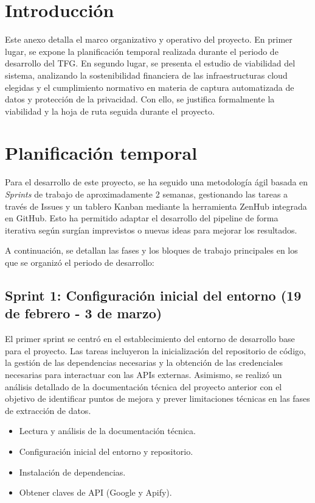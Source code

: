 
\section{Introducción}
Este anexo detalla el marco organizativo y operativo del proyecto. En primer lugar, se expone la planificación temporal realizada durante el periodo de desarrollo del TFG. En segundo lugar, se presenta el estudio de viabilidad del sistema, analizando la sostenibilidad financiera de las infraestructuras cloud elegidas y el cumplimiento normativo en materia de captura automatizada de datos y protección de la privacidad. Con ello, se justifica formalmente la viabilidad y la hoja de ruta seguida durante el proyecto.


\section{Planificación temporal}
Para el desarrollo de este proyecto, se ha seguido una metodología ágil basada en \textit{Sprints} de trabajo de aproximadamente 2 semanas, gestionando las tareas a través de Issues y un tablero Kanban mediante la herramienta ZenHub integrada en GitHub. Esto ha permitido adaptar el desarrollo del pipeline de forma iterativa según surgían imprevistos o nuevas ideas para mejorar los resultados. 

A continuación, se detallan las fases y los bloques de trabajo principales en los que se organizó el periodo de desarrollo:

\subsection{Sprint 1: Configuración inicial del entorno (19 de febrero - 3 de marzo)}
El primer sprint se centró en el establecimiento del entorno de desarrollo base para el proyecto. Las tareas incluyeron la inicialización del repositorio de código, la gestión de las dependencias necesarias y la obtención de las credenciales necesarias para interactuar con las APIs externas. Asimismo, se realizó un análisis detallado de la documentación técnica del proyecto anterior con el objetivo de identificar puntos de mejora y prever limitaciones técnicas en las fases de extracción de datos.
\begin{itemize}
    \item Lectura y análisis de la documentación técnica.
    \item Configuración inicial del entorno y repositorio.
    \item Instalación de dependencias.
    \item Obtener claves de API (Google y Apify).
\end{itemize}

